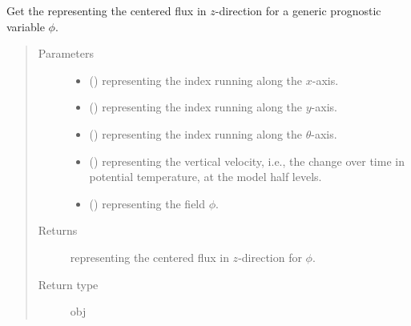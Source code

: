 \documentclass[letterpaper,10pt,english]{sphinxmanual}
\begin{document}
\begin{fulllineitems}
\begin{fulllineitems}
\label{\detokenize{api:dycore.flux_isentropic_centered.FluxIsentropicCentered._get_centered_flux_z}}
Get the  representing the centered flux in \(z\)-direction for a generic
prognostic variable \(\phi\).
\begin{quote}\begin{description}
\item[{Parameters}] \leavevmode\begin{itemize}
\item {} 
 () \textendash{}  representing the index running along the \(x\)-axis.

\item {} 
 () \textendash{}  representing the index running along the \(y\)-axis.

\item {} 
 () \textendash{}  representing the index running along the \(\theta\)-axis.

\item {} 
 () \textendash{}  representing the vertical velocity, i.e., the change over time in
potential temperature, at the model half levels.

\item {} 
 () \textendash{}  representing the field \(\phi\).

\end{itemize}

\item[{Returns}] \leavevmode
{} representing the centered flux in \(z\)-direction for \(\phi\).

\item[{Return type}] \leavevmode
obj

\end{description}\end{quote}

\end{fulllineitems}


\end{fulllineitems}
\end{document}

